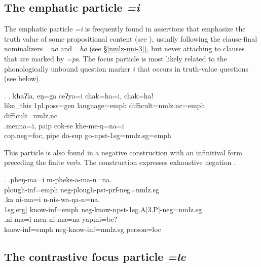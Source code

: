 \subsection{The emphatic particle \emph{=i}}
 
 The emphatic  particle \emph{=i} is frequently found  in assertions that emphasize the truth value of some propositional content (see \Next ), usually following the clause-final nominalizers \emph{=na} and \emph{=ha} (see §\ref{nmlz-uni-3}), but never attaching to clauses that are marked by \emph{=pa}. The focus particle is most likely related to the phonologically unbound question marker \emph{i} that occurs in truth-value questions (see below).

 
 \ex. \ag. khaʔla,  eŋ=ga              ceʔya=i   chak=ha=i, chak=ha!\\
	 like\_this {\sc 1pl.poss=gen} language{\sc =emph} difficult{\sc =nmlz.nc=emph} difficult{\sc =nmlz.nc}  \\
	  
	 	 \bg.menna=i, paip cok-se khe-me-ŋ=na=i\\
	 {\sc cop.neg=foc}, pipe do{\sc -sup} go{\sc -npst-1sg=nmlz.sg=emph}\\
	
	
This  particle is also found in a negative construction with an infinitival form preceding the finite verb. The construction expresses exhaustive negation .
	
\ex. \ag.pheŋ-ma=i              m-pheks-a-ma-n=na.\\
plough{\sc -inf=emph} {\sc neg-}plough{\sc [3sg]-pst-prf-neg=nmlz.sg}\\
\bg.ka  ni-ma=i          n-nis-wa-ŋa-n=na.\\
{\sc 1sg[erg]} know{\sc -inf=emph} {\sc neg-}know{\sc -npst-1sg.A[3.P]-neg=nmlz.sg}\\
\bg.ni-ma=i          men-ni-ma=na              yapmi=be?\\
know{\sc -inf=emph} {\sc neg-}know{\sc -inf=nmlz.sg} person{\sc =loc}\\
 
 
\subsection{The contrastive focus particle \emph{=le}}
   
